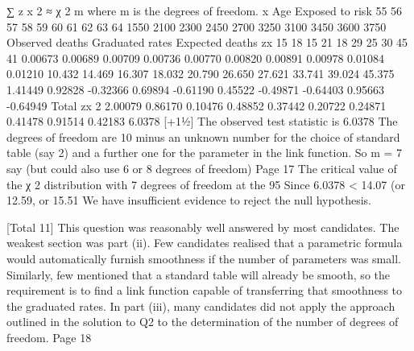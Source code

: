 \documentclass[a4paper,12pt]{article}
\begin{document}
∑ z x 2 ≈ χ 2 m where m is the degrees of freedom.
x
Age Exposed
to risk
55
56
57
58
59
60
61
62
63
64 1550
2100
2300
2450
2700
3250
3100
3450
3600
3750
Observed
deaths Graduated
rates Expected
deaths zx
15
18
15
21
18
29
25
30
45
41 0.00673
0.00689
0.00709
0.00736
0.00770
0.00820
0.00891
0.00978
0.01084
0.01210 10.432
14.469
16.307
18.032
20.790
26.650
27.621
33.741
39.024
45.375 1.41449
0.92828
-0.32366
0.69894
-0.61190
0.45522
-0.49871
-0.64403
0.95663
-0.64949
Total
zx 2
2.00079
0.86170
0.10476
0.48852
0.37442
0.20722
0.24871
0.41478
0.91514
0.42183
6.0378
[+11⁄2]
The observed test statistic is 6.0378 
The degrees of freedom are 10 minus an unknown number for the
choice of standard table (say 2) and a further one for the parameter in
the link function. 
So m = 7 say (but could also use 6 or 8 degrees of freedom) 
Page 17
The critical value of the χ 2 distribution with 7 degrees of
freedom at the 95%
Since 6.0378 < 14.07 (or 12.59, or 15.51 
We have insufficient evidence to reject the null hypothesis. 

[Total 11]
This question was reasonably well answered by most
candidates. The weakest section was part (ii). Few
candidates realised that a parametric formula would
automatically furnish smoothness if the number of parameters
was small. Similarly, few mentioned that a standard table will
already be smooth, so the requirement is to find a link
function capable of transferring that smoothness to the
graduated rates. In part (iii), many candidates did not apply
the approach outlined in the solution to Q2 to the
determination of the number of degrees of freedom.
Page 18
\end{document}

